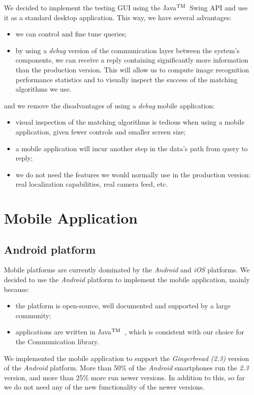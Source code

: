 \documentclass[a4paper,onecolumn,oneside,titlepage,12pt]{report}
\def\tm{\leavevmode\hbox{$\rm {}^{TM}$}}
\begin{document}
We decided to implement the testing GUI using the Java\tm\ Swing API and use it as a standard desktop application. This way, we have several advantages:
\begin{itemize}
	\item we can control and fine tune queries;
	\item by using a \emph{debug} version of the communication layer between the system's components, we can receive a reply containing significantly more information than the production version. This will allow us to compute image recognition performance statistics and to visually inspect the success of the matching algorithms we use.
\end{itemize}
and we remove the disadvantages of using a \emph{debug} mobile application:
\begin{itemize}
	\item visual inspection of the matching algorithms is tedious when using a mobile application, given fewer controls and smaller screen size;
	\item a mobile application will incur another step in the data's path from query to reply;
	\item we do not need the features we would normally use in the production version: real localization capabilities, real camera feed, etc.
\end{itemize}

\section{Mobile Application}
\subsection{Android platform}
Mobile platforms are currently dominated by the \emph{Android} and \emph{iOS} platforms. We decided to use the \emph{Android} platform to implement the mobile application, mainly because:
\begin{itemize}
	\item the platform is open-source, well documented and supported by a large community;
	\item applications are written in Java\tm\ , which is consistent with our choice for the Communication library.
\end{itemize}
We implemented the mobile application to support the \emph{Gingerbread (2.3)} version of the \emph{Android} platform. More than 50\% of the \emph{Android} smartphones run the \emph{2.3} version, and more than 25\% more run newer versions. In addition to this, so far we do not need any of the new functionality of the newer versions.
\end{document}
